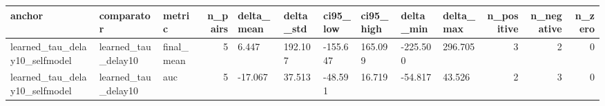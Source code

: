 \begin{tabular}{lllrllllllrrr}
\toprule
anchor & comparator & metric & n_pairs & delta_mean & delta_std & ci95_low & ci95_high & delta_min & delta_max & n_positive & n_negative & n_zero \\
\midrule
learned_tau_delay10_selfmodel & learned_tau_delay10 & final_mean & 5 & 6.447 & 192.107 & -155.647 & 165.099 & -225.500 & 296.705 & 3 & 2 & 0 \\
learned_tau_delay10_selfmodel & learned_tau_delay10 & auc & 5 & -17.067 & 37.513 & -48.591 & 16.719 & -54.817 & 43.526 & 2 & 3 & 0 \\
\bottomrule
\end{tabular}
